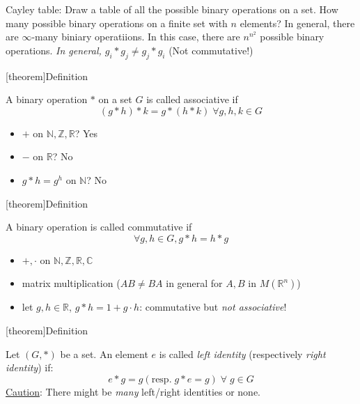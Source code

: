 \documentclass[12pt]{report}
\theoremstyle{definition}
\begin{document}
\begin{ex}
    Cayley table: Draw a table of all the possible binary operations on a set.
    How many possible binary operations on a finite set with $n$ elements?
    In general, there are $\infty$-many biniary operatiions. In this case, there are $n^{n^2}$ possible binary operations.
    \emph{In general, $g_i * g_j \neq g_j * g_i$} (Not commutative!)
    
\end{ex}

[theorem]{Definition}
\begin{Associativity}
    A binary operation $*$ on a set $G$ is called associative if\[
        (g*h)*k = g*(h*k) \;\forall g,h,k \in G
    \]
\end{Associativity}

\begin{ex}
    \;

    \begin{itemize}
        \item $+$ on $\mathbb{N}, \mathbb{Z}, \mathbb{R}$? Yes
        \item $-$ on $\mathbb{R}$? No
        \item $g*h = g^{h}$ on $\mathbb{N}$? No
    \end{itemize}
    
\end{ex}

[theorem]{Definition}
\begin{commutative}
    A binary operation is called commutative if \[
        \forall g, h \in G, g * h = h * g
    \]
\end{commutative}

\begin{ex}
    \;

    \begin{itemize}
        \item $+, \cdot$ on $\mathbb{N}, \mathbb{Z}, \mathbb{R}, \mathbb{C}$
        \item matrix multiplication ($AB \neq BA$ in general for $A, B$ in $M(\mathbb{R}^n)$)
        \item let $g, h \in \mathbb{R}$, $g * h = 1 + g \cdot h$: commutative but \emph{not associative}!
    \end{itemize}
    
\end{ex}

[theorem]{Definition}
\begin{identity element}
    Let $(G, *)$ be a set. An element $e$ is called \emph{left identity} (respectively \emph{right identity}) if:\[
        e * g = g (\text{resp.}\; g * e = g) \;\forall\; g \in G
    \]
    \underline{Caution}: There might be \emph{many} left/right identities or none.
\end{identity element}
\end{document}
